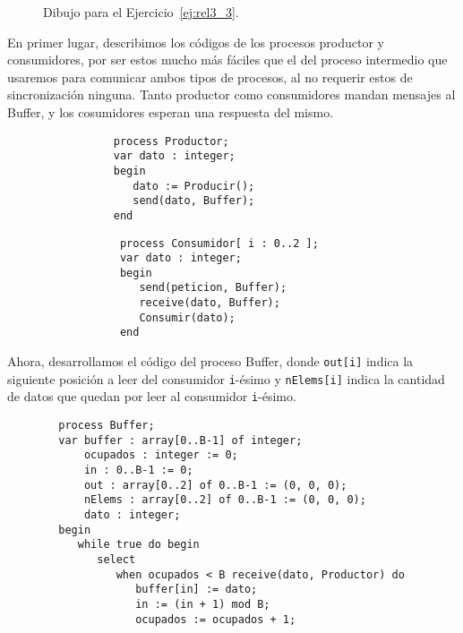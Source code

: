 \begin{ejercicio}
\begin{figure}[H]
    \caption{Dibujo para el Ejercicio~\ref{ej:rel3_3}.}
    \label{fig:fig_ej_3}
    \end{figure}

    En primer lugar, describimos los códigos de los procesos productor y consumidores, por ser estos mucho más fáciles que el del proceso intermedio que usaremos para comunicar ambos tipos de procesos, al no requerir estos de sincronización ninguna. Tanto productor como consumidores mandan mensajes al Buffer, y los cosumidores esperan una respuesta del mismo.
    \begin{figure}[H]
        \centering
    \setlength{\columnsep}{1cm}
    \begin{multicols}{2}
        \begin{verbatim}
           process Productor;
           var dato : integer;
           begin
              dato := Producir();
              send(dato, Buffer);
           end
        \end{verbatim}
        \begin{verbatim}
            process Consumidor[ i : 0..2 ];
            var dato : integer;
            begin
               send(peticion, Buffer);
               receive(dato, Buffer);
               Consumir(dato);
            end
        \end{verbatim}
    \end{multicols}
    \end{figure}
    Ahora, desarrollamos el código del proceso Buffer, donde \verb|out[i]| indica la siguiente posición a leer del consumidor \verb|i|-ésimo y \verb|nElems[i]| indica la cantidad de datos que quedan por leer al consumidor \verb|i|-ésimo. 
    \begin{verbatim}
        process Buffer;
        var buffer : array[0..B-1] of integer;
            ocupados : integer := 0;
            in : 0..B-1 := 0;
            out : array[0..2] of 0..B-1 := (0, 0, 0);
            nElems : array[0..2] of 0..B-1 := (0, 0, 0);
            dato : integer;
        begin
           while true do begin
              select 
                 when ocupados < B receive(dato, Productor) do
                    buffer[in] := dato;
                    in := (in + 1) mod B;
                    ocupados := ocupados + 1;
                    

\end{verbatim}
\end{ejercicio}
